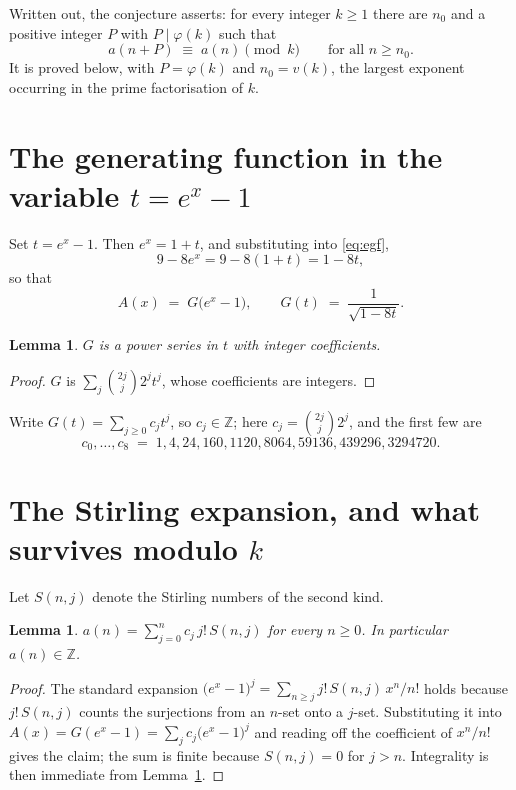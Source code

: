 \documentclass[11pt,a4paper]{article}
\theoremstyle{plain}
\newtheorem{lemma}[theorem]{Lemma}
\theoremstyle{definition}
\begin{document}
Written out, the conjecture asserts: for every integer $k\ge 1$ there are $n_0$ and a
positive integer $P$ with $P\mid\varphi(k)$ such that
\begin{equation}\label{eq:conj}
a(n+P)\;\equiv\;a(n)\pmod{k}\qquad\text{for all } n\ge n_0 .
\end{equation}
It is proved below, with $P=\varphi(k)$ and $n_0=v(k)$, the largest exponent occurring in
the prime factorisation of $k$.

\section{The generating function in the variable $t=e^{x}-1$}

Set $t=e^{x}-1$. Then $e^{x}=1+t$, and substituting into \eqref{eq:egf},
\[
9-8e^{x}=9-8(1+t)=1-8t,
\]
so that
\begin{equation}\label{eq:G}
A(x)\;=\;G\bigl(e^{x}-1\bigr),\qquad
G(t)\;=\;\frac{1}{\sqrt{1-8t}}.
\end{equation}

\begin{lemma}\label{lem:int}
$G$ is a power series in $t$ with integer coefficients.
\end{lemma}

\begin{proof}
$G$ is $\sum_j \binom{2j}{j}2^{j}t^{j}$, whose coefficients are integers.
\end{proof}

Write $G(t)=\sum_{j\ge0}c_j t^{j}$, so $c_j\in\mathbb{Z}$; here $c_j=\binom{2j}{j}2^{j}$, and the
first few are
\[
c_0,\dots,c_8 \;=\; 1, 4, 24, 160, 1120, 8064, 59136, 439296, 3294720.
\]

\section{The Stirling expansion, and what survives modulo $k$}

Let $S(n,j)$ denote the Stirling numbers of the second kind.

\begin{lemma}\label{lem:stir}
$a(n)=\sum_{j=0}^{n} c_j\, j!\, S(n,j)$ for every $n\ge 0$. In particular $a(n)\in\mathbb{Z}$.
\end{lemma}

\begin{proof}
The standard expansion $\bigl(e^{x}-1\bigr)^{j}
=\sum_{n\ge j} j!\,S(n,j)\,x^{n}/n!$ holds because $j!\,S(n,j)$ counts the surjections
from an $n$-set onto a $j$-set. Substituting it into
$A(x)=G(e^{x}-1)=\sum_j c_j\bigl(e^{x}-1\bigr)^{j}$ and reading off the coefficient of
$x^{n}/n!$ gives the claim; the sum is finite because $S(n,j)=0$ for $j>n$. Integrality is
then immediate from Lemma~\ref{lem:int}.
\end{proof}
\end{document}

